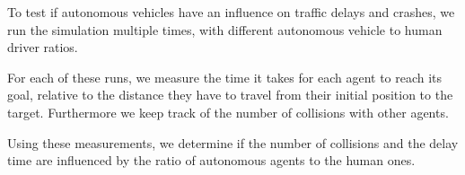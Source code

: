 To test if autonomous vehicles have an influence on traffic delays and crashes, we run the simulation multiple times, with different autonomous vehicle to human driver ratios.

For each of these runs, we measure the time it takes for each agent to reach its goal, relative to the distance they have to travel from their initial position to the target. Furthermore we keep track of the number of collisions with other agents. 

Using these measurements, we  determine if the number of collisions and the delay time are influenced by the ratio of autonomous agents to the human ones. 



